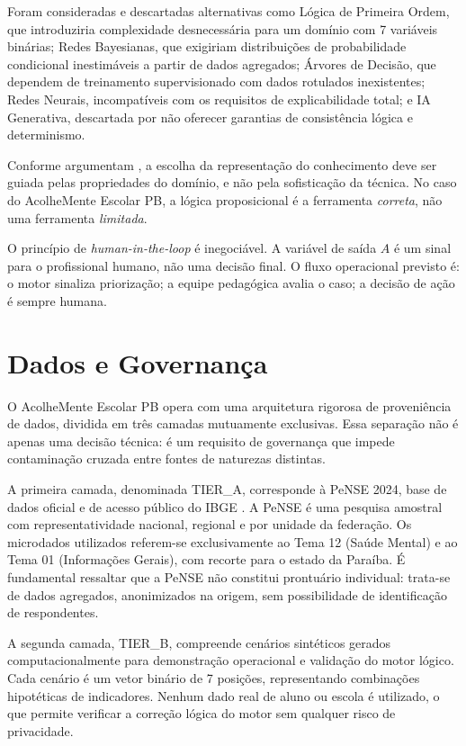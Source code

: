 \documentclass[
    12pt,
    openright,
    oneside,
    a4paper,
    english,
    brazil
]{abntex2}
\begin{document}
Foram consideradas e descartadas alternativas como Lógica de Primeira Ordem, que introduziria complexidade desnecessária para um domínio com 7 variáveis binárias; Redes Bayesianas, que exigiriam distribuições de probabilidade condicional inestimáveis a partir de dados agregados; Árvores de Decisão, que dependem de treinamento supervisionado com dados rotulados inexistentes; Redes Neurais, incompatíveis com os requisitos de explicabilidade total; e IA Generativa, descartada por não oferecer garantias de consistência lógica e determinismo.

Conforme argumentam , a escolha da representação do conhecimento deve ser guiada pelas propriedades do domínio, e não pela sofisticação da técnica. No caso do AcolheMente Escolar PB, a lógica proposicional é a ferramenta \textit{correta}, não uma ferramenta \textit{limitada}.

O princípio de \textit{human-in-the-loop} é inegociável. A variável de saída $A$ é um sinal para o profissional humano, não uma decisão final. O fluxo operacional previsto é: o motor sinaliza priorização; a equipe pedagógica avalia o caso; a decisão de ação é sempre humana.

\chapter{Dados e Governança}

O AcolheMente Escolar PB opera com uma arquitetura rigorosa de proveniência de dados, dividida em três camadas mutuamente exclusivas. Essa separação não é apenas uma decisão técnica: é um requisito de governança que impede contaminação cruzada entre fontes de naturezas distintas.

A primeira camada, denominada TIER\_A, corresponde à PeNSE 2024, base de dados oficial e de acesso público do IBGE \cite{ibge_pense_2024}. A PeNSE é uma pesquisa amostral com representatividade nacional, regional e por unidade da federação. Os microdados utilizados referem-se exclusivamente ao Tema 12 (Saúde Mental) e ao Tema 01 (Informações Gerais), com recorte para o estado da Paraíba. É fundamental ressaltar que a PeNSE não constitui prontuário individual: trata-se de dados agregados, anonimizados na origem, sem possibilidade de identificação de respondentes.

A segunda camada, TIER\_B, compreende cenários sintéticos gerados computacionalmente para demonstração operacional e validação do motor lógico. Cada cenário é um vetor binário de 7 posições, representando combinações hipotéticas de indicadores. Nenhum dado real de aluno ou escola é utilizado, o que permite verificar a correção lógica do motor sem qualquer risco de privacidade.
\end{document}
